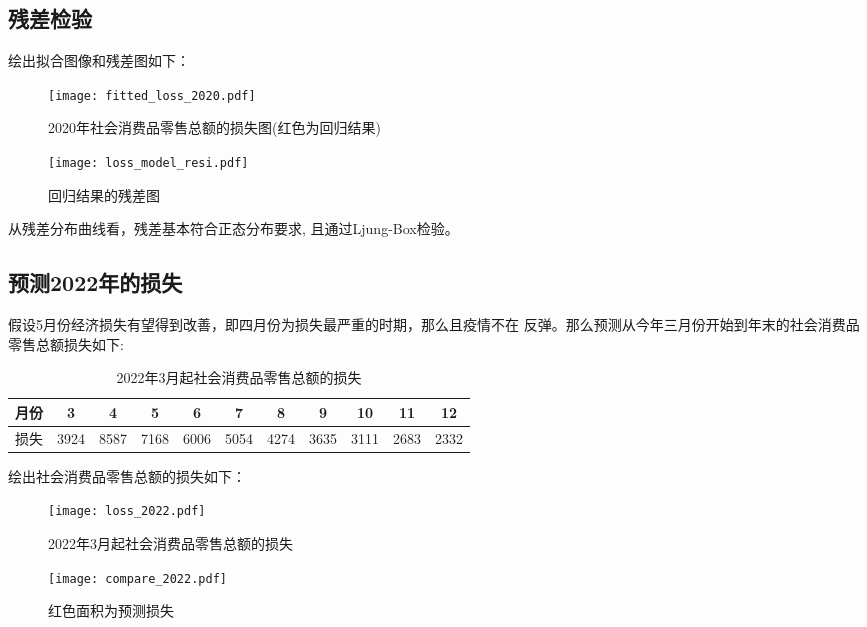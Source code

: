 \documentclass[12pt,a4paper]{nmmcm}
\begin{document}
  \subsection{残差检验}
  绘出拟合图像和残差图如下：
  \begin{figure}[H] %
    \centering %
    \begin{minipage}[t]{0.48\textwidth}
      \centering
      \texttt{[image: fitted\_loss\_2020.pdf]} %
      \caption{2020年社会消费品零售总额的损失图(红色为回归结果)} %
      \label{fitted_loss_2020} %
    \end{minipage}
    \begin{minipage}[t]{0.48\textwidth}
      \centering %
      \texttt{[image: loss\_model\_resi.pdf]} %
      \caption{回归结果的残差图} %
      \label{loss_model_resi} %
    \end{minipage}
  \end{figure} 
  从残差分布曲线看，残差基本符合正态分布要求, 且通过Ljung-Box检验。
  \subsection{预测2022年的损失}
  假设5月份经济损失有望得到改善，即四月份为损失最严重的时期，那么且疫情不在
  反弹。那么预测从今年三月份开始到年末的社会消费品零售总额损失如下:
  \begin{table}[H]
    \centering
    \caption{2022年3月起社会消费品零售总额的损失}
      \begin{tabular}{ccccccccccc}
      月份    & 3     & 4     & 5     & 6     & 7     & 8     & 9     & 10    & 11    & 12 \\
      \hline
      损失    & 3924 & 8587 & 7168 & 6006 & 5054 & 4274 & 3635 & 3111 & 2683 & 2332 \\
      \end{tabular}%
    \label{loss_2020_table}%
  \end{table}%
  绘出社会消费品零售总额的损失如下：
  \begin{figure}[H] %
    \centering %
    \begin{minipage}[t]{0.48\textwidth}
      \centering
      \texttt{[image: loss\_2022.pdf]} %
      \caption{2022年3月起社会消费品零售总额的损失} %
      \label{loss_2022} %
    \end{minipage}
    \begin{minipage}[t]{0.48\textwidth}
      \centering %
      \texttt{[image: compare\_2022.pdf]} %
      \caption{红色面积为预测损失} %
      \label{compare_2022} %
    \end{minipage}
  \end{figure} 
\newpage


\end{document}
